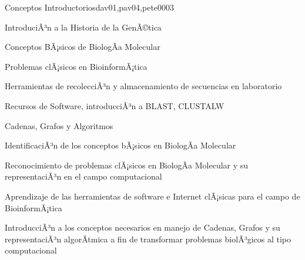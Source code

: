 \begin{syllabus}
\begin{unit}{Conceptos Introductorios}{dav01,pav04,pete00}{0}{3}
\begin{topics}
        \item IntroduciÃ³n a la Historia de la GenÃ©tica
        \item Conceptos BÃ¡sicos de BiologÃ­a Molecular
        \item Problemas clÃ¡sicos en BioinformÃ¡tica
        \item Herramientas de recolecciÃ³n y almacenamiento de secuencias en laboratorio
        \item Recursos de Software, introducciÃ³n a BLAST, CLUSTALW
        \item Cadenas, Grafos y Algoritmos
    \end{topics}
    \begin{unitgoals}
        \item IdentificaciÃ³n de los conceptos bÃ¡sicos en BiologÃ­a Molecular
        \item Reconocimiento de problemas clÃ¡sicos en BiologÃ­a Molecular y su representaciÃ³n en el campo computacional
        \item Aprendizaje de las herramientas de software e Internet clÃ¡sicas para el campo de BioinformÃ¡tica
        \item IntroducciÃ³n a los conceptos necesarios en manejo de Cadenas, Grafos y su representaciÃ³n algorÃ­tmica a fin de transformar problemas biolÃ³gicos al tipo computacional
    \end{unitgoals}
\end{unit}


\end{syllabus}

